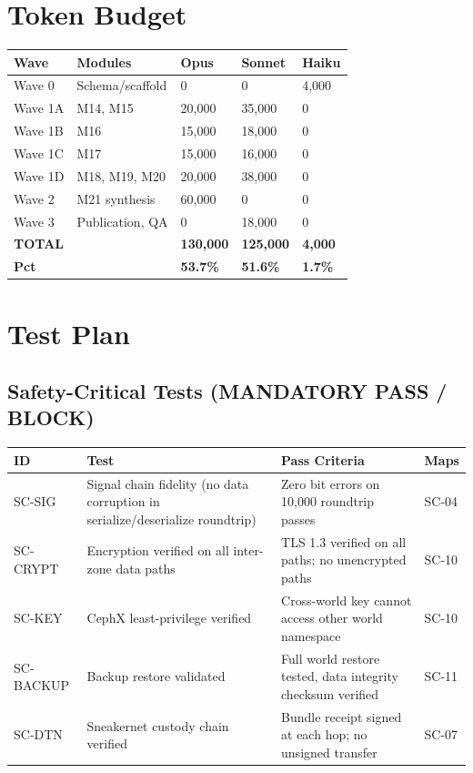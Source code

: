 \documentclass[11pt,letterpaper]{article}
\newcommand{\thead}[1]{\cellcolor{TableHead}\textbf{\sffamily\color{white}\small #1}}
\newcommand{\altrow}{\rowcolor{TableAlt}}
\begin{document}
\section{Token Budget}

\begin{longtable}{p{3cm}p{3cm}p{2.5cm}p{2.5cm}p{3cm}}
\toprule
\thead{Wave} & \thead{Modules} & \thead{Opus} & \thead{Sonnet} & \thead{Haiku} \\
\midrule
\endhead
Wave 0 & Schema/scaffold & 0 & 0 & 4,000 \\
\altrow Wave 1A & M14, M15 & 20,000 & 35,000 & 0 \\
Wave 1B & M16 & 15,000 & 18,000 & 0 \\
\altrow Wave 1C & M17 & 15,000 & 16,000 & 0 \\
Wave 1D & M18, M19, M20 & 20,000 & 38,000 & 0 \\
\altrow Wave 2 & M21 synthesis & 60,000 & 0 & 0 \\
Wave 3 & Publication, QA & 0 & 18,000 & 0 \\
\midrule
\textbf{TOTAL} & & \textbf{130,000} & \textbf{125,000} & \textbf{4,000} \\
\altrow \textbf{Pct} & & \textbf{53.7\%} & \textbf{51.6\%} & \textbf{1.7\%} \\
\bottomrule
\end{longtable}

\section{Test Plan}

\subsection{Safety-Critical Tests (MANDATORY PASS / BLOCK)}

\begin{longtable}{p{2cm}p{5cm}p{4.5cm}p{1cm}}
\toprule
\thead{ID} & \thead{Test} & \thead{Pass Criteria} & \thead{Maps} \\
\midrule
\endhead
SC-SIG & Signal chain fidelity (no data corruption in serialize/deserialize roundtrip) & Zero bit errors on 10,000 roundtrip passes & SC-04 \\
\altrow SC-CRYPT & Encryption verified on all inter-zone data paths & TLS 1.3 verified on all paths; no unencrypted paths & SC-10 \\
SC-KEY & CephX least-privilege verified & Cross-world key cannot access other world namespace & SC-10 \\
\altrow SC-BACKUP & Backup restore validated & Full world restore tested, data integrity checksum verified & SC-11 \\
SC-DTN & Sneakernet custody chain verified & Bundle receipt signed at each hop; no unsigned transfer & SC-07 \\
\bottomrule
\end{longtable}
\end{document}
